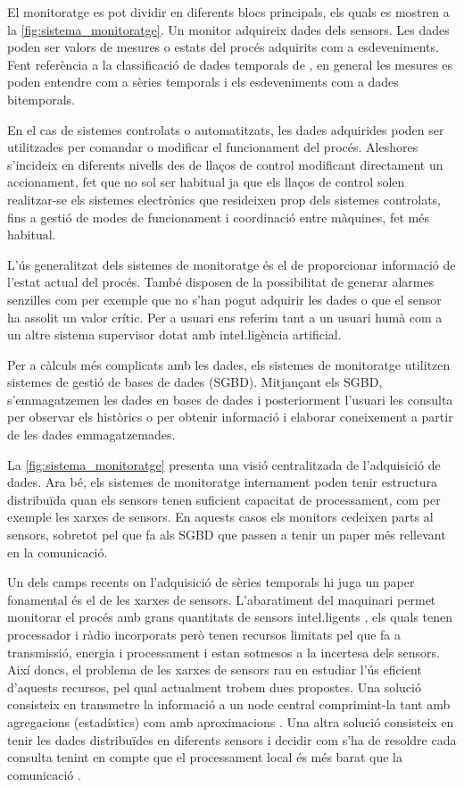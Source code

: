 El monitoratge es pot dividir en diferents blocs principals, els quals
es mostren a la \autoref{fig:sistema_monitoratge}. Un monitor
adquireix dades dels sensors. Les dades poden ser valors de mesures o
estats del procés adquirits com a esdeveniments. Fent referència a la
classificació de dades temporals de \textcite{assfalg08:thesis}, en
general les mesures es poden entendre com a sèries temporals i els
esdeveniments com a dades bitemporals.

En el cas de sistemes controlats o automatitzats, les dades adquirides
poden ser utilitzades per comandar o modificar el funcionament del
procés. Aleshores s'incideix en diferents nivells des de llaços de
control modificant directament un accionament, fet que no sol ser
habitual ja que els llaços de control solen realitzar-se els sistemes
electrònics que resideixen prop dels sistemes controlats, fins a
gestió de modes de funcionament i coordinació entre màquines, fet més
habitual.

L'ús generalitzat dels sistemes de monitoratge és el de proporcionar
informació de l'estat actual del procés. També disposen de la
possibilitat de generar alarmes senzilles com per exemple que no s'han
pogut adquirir les dades o que el sensor ha assolit un valor
crític. Per a usuari ens referim tant a un usuari humà com a un altre
sistema supervisor dotat amb inte\l.ligència artificial.

Per a càlculs més complicats amb les dades, els sistemes de
monitoratge utilitzen sistemes de gestió de bases de dades
(SGBD). Mitjançant els SGBD, s'emmagatzemen les dades en bases de
dades i posteriorment l'usuari les consulta per observar els històrics
o per obtenir informació i elaborar coneixement a partir de les dades
emmagatzemades.

La \autoref{fig:sistema_monitoratge} presenta una visió centralitzada
de l'adquisició de dades. Ara bé, els sistemes de monitoratge
internament poden tenir estructura distribuïda quan els sensors tenen
suficient capacitat de processament, com per exemple les xarxes de
sensors. En aquests casos els monitors cedeixen parts al sensors,
sobretot pel que fa als SGBD que passen a tenir un paper més rellevant
en la comunicació.


Un dels camps recents on l'adquisició de sèries temporals hi juga un
paper fonamental és el de les xarxes de sensors. L'abaratiment del
maquinari permet monitorar el procés amb grans quantitats de sensors
inte\l.ligents \parencite{jainagrawal05,yaogehrke02}, els quals tenen
processador i ràdio incorporats però tenen recursos limitats pel que
fa a transmissió, energia i processament i estan sotmesos a la
incertesa dels sensors. Així doncs, el problema de les xarxes de
sensors rau en estudiar l'ús eficient d'aquests recursos, pel qual
actualment trobem dues propostes.  Una solució consisteix en
transmetre la informació a un node central comprimint-la tant amb
agregacions (estadístics) com amb
aproximacions \parencite{deligiannakis07}.  Una altra solució
consisteix en tenir les dades distribuïdes en diferents sensors i
decidir com s'ha de resoldre cada consulta tenint en compte que el
processament local és més barat que la
comunicació \parencite{yaogehrke02,gehrkemadden04,bonnet01}.

